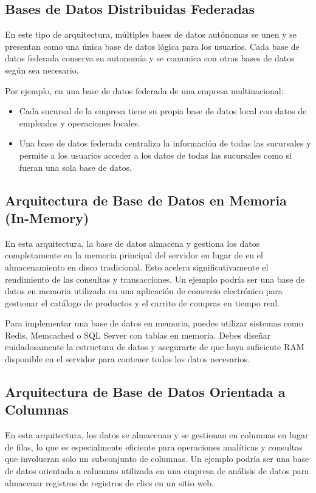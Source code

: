 \subsection{Bases de Datos Distribuidas Federadas}
\noindent
En este tipo de arquitectura, múltiples bases de datos autónomas se unen y se presentan como una única base de datos lógica para los usuarios. Cada base de datos federada conserva su autonomía y se comunica con otras bases de datos según sea necesario.

Por ejemplo, en una base de datos federada de una empresa multinacional:
\begin{itemize}
	\item Cada sucursal de la empresa tiene su propia base de datos local con datos de empleados y operaciones locales.
	\item Una base de datos federada centraliza la información de todas las sucursales y permite a los usuarios acceder a los datos de todas las sucursales como si fueran una sola base de datos.
\end{itemize}

\subsection{Arquitectura de Base de Datos en Memoria (In-Memory)}
\noindent
En esta arquitectura, la base de datos almacena y gestiona los datos completamente en la memoria principal del servidor en lugar de en el almacenamiento en disco tradicional. Esto acelera significativamente el rendimiento de las consultas y transacciones. Un ejemplo podría ser una base de datos en memoria utilizada en una aplicación de comercio electrónico para gestionar el catálogo de productos y el carrito de compras en tiempo real.

Para implementar una base de datos en memoria, puedes utilizar sistemas como Redis, Memcached o SQL Server con tablas en memoria. Debes diseñar cuidadosamente la estructura de datos y asegurarte de que haya suficiente RAM disponible en el servidor para contener todos los datos necesarios.

\subsection{Arquitectura de Base de Datos Orientada a Columnas}
\noindent
En esta arquitectura, los datos se almacenan y se gestionan en columnas en lugar de filas, lo que es especialmente eficiente para operaciones analíticas y consultas que involucran solo un subconjunto de columnas. Un ejemplo podría ser una base de datos orientada a columnas utilizada en una empresa de análisis de datos para almacenar registros de registros de clics en un sitio web.

